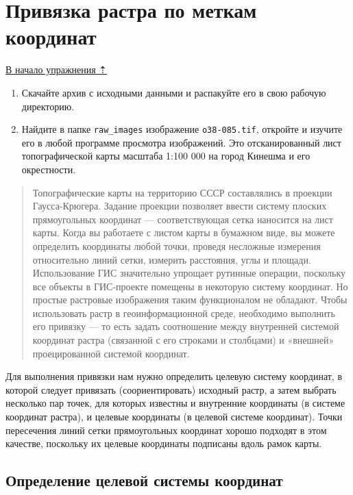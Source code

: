 \documentclass[
  12pt,
]{book}
\begin{document}
\hypertarget{raster-reference-input}{%
\section{Привязка растра по меткам координат}\label{raster-reference-input}}

\protect\hyperlink{raster-reference}{В начало упражнения ⇡}

\begin{enumerate}
\def\labelenumi{\arabic{enumi}.}
\item
  Скачайте архив с исходными данными и распакуйте его в свою рабочую директорию.
\item
  Найдите в папке \texttt{raw\_images} изображение \texttt{o38-085.tif}, откройте и изучите его в любой программе просмотра изображений. Это отсканированный лист топографической карты масштаба 1:100 000 на город Кинешма и его окрестности.
\end{enumerate}

\begin{quote}
Топографические карты на территорию СССР составлялись в проекции Гаусса-Крюгера. Задание проекции позволяет ввести систему плоских прямоугольных координат --- соответствующая сетка наносится на лист карты. Когда вы работаете с листом карты в бумажном виде, вы можете определить координаты любой точки, проведя несложные измерения относительно линий сетки, измерить расстояния, углы и площади. Использование ГИС значительно упрощает рутинные операции, поскольку все объекты в ГИС-проекте помещены в некоторую систему координат. Но простые растровые изображения таким функционалом не обладают.
Чтобы использовать растр в геоинформационной среде, необходимо выполнить его привязку --- то есть задать соотношение между внутренней системой координат растра (связанной с его строками и столбцами) и «внешней» проецированной системой координат.
\end{quote}

Для выполнения привязки нам нужно определить целевую систему координат, в которой следует привязать (соориентировать) исходный растр, а затем выбрать несколько пар точек, для которых известны и внутренние координаты (в системе координат растра), и целевые координаты (в целевой системе координат). Точки пересечения линий сетки прямоугольных координат хорошо подходят в этом качестве, поскольку их целевые координаты подписаны вдоль рамок карты.

\hypertarget{raster-reference-select-coordinate-system}{%
\subsection{Определение целевой системы координат}\label{raster-reference-select-coordinate-system}}
\end{document}
